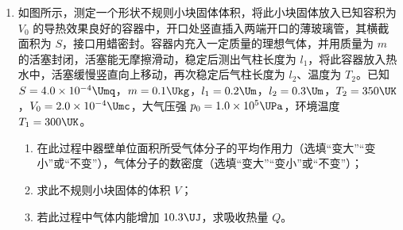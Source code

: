 \documentclass[\gkver]{gaokaozhenti}
\begin{document}
\begin{enumerate}
{（2）实现电压可从零开始调节，滑动变阻器采用分压式接法，P 应连接 a；根据图 C 可知电压表选取 $0\sim3\UV$ 量程，故 Q 接 d；
多用电表量程为 $50\UmA$，分度值为 $1\UmA$，需要估读到 $0.1\UmA$，故电表的读数为 $45.0\UmA$。

（3）根据图像可知 $I$ 随 $U$ 非线性变化，故说明该二极管是非线性元件，根据图像可知正常发光时即有电流通过时电压在 $1.9\UV\sim2.5\UV$ 范围。

Ⅲ．③要求 P$_{1}$ 和 P$_{2}$ 在一条光线上，该光线透过玻璃砖后过 P$_{3}$，故 P$_{3}$ 要能挡住 P$_{1}$ 和 P$_{2}$ 的虚像；

④cd 与 ab 垂直，则过 P$_{1}$ 和 P$_{2}$ 的光线与 ab 垂直，光垂直入射时传播方向不变，可确定 ef 边上的入射点，此时只需要找到折射光线上的一点即可确定出射光线，不需要插第四枚大头针；

⑤根据几何关系可知入射角为 $\theta$，折射角为 $\frac{\pi}{2} - \alpha$，故
$n = \frac{\sin\left(\frac{\pi}{2} - \alpha\right)}{\sin\theta} = \frac{\cos\alpha}{\sin\theta}$
}

\item
如图所示，测定一个形状不规则小块固体体积，将此小块固体放入已知容积为 $V_{0}$ 的导热效果良好的容器中，开口处竖直插入两端开口的薄玻璃管，其横截面积为 $S$，接口用蜡密封。容器内充入一定质量的理想气体，并用质量为 $m$ 的活塞封闭，活塞能无摩擦滑动，稳定后测出气柱长度为 $l_{1}$，将此容器放入热水中，活塞缓慢竖直向上移动，再次稳定后气柱长度为 $l_{2}$、温度为 $T_{2}$。已知 $S = 4.0\times10^{-4}\Umq$，$m = 0.1\Ukg$，$l_{1} = 0.2\Um$，$l_{2} = 0.3\Um$，$T_{2} = 350\UK$，$V_{0} = 2.0\times10^{-4}\Umc$，大气压强 $p_{0} = 1.0\times10^{5}\UPa$，环境温度 $T_{1} = 300\UK$。

\begin{enumerate}
	\item
	在此过程中器壁单位面积所受气体分子的平均作用力（选填“变大”“变小”或“不变”），气体分子的数密度（选填“变大”“变小”或“不变”）；
	\item
	求此不规则小块固体的体积 $V$；
	\item
	若此过程中气体内能增加 $10.3\UJ$，求吸收热量 $Q$。
\end{enumerate}
\end{enumerate}
\end{document}

